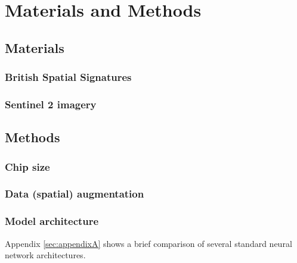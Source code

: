 \section{Materials and Methods}
\label{sec:matmet}

\subsection{Materials}

\subsubsection{British Spatial Signatures}


\subsubsection{Sentinel 2 imagery}


\subsection{Methods}


\subsubsection{Chip size}


\subsubsection{Data (spatial) augmentation}



\subsubsection{Model architecture}



Appendix \ref*{sec:appendixA} shows a brief comparison of several standard neural network architectures.

